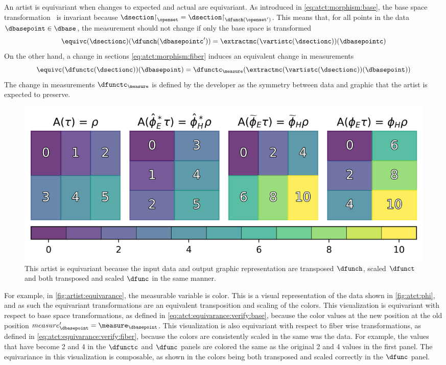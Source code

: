 \documentclass[10pt,journal,compsoc]{IEEEtran}
\renewcommand{\restriction}{\mathord{\upharpoonright}} %
\theoremstyle{definition}
\theoremstyle{remark}
\begin{document}
An artist is equivariant when changes to expected and actual are equivariant. As introduced in \autoref{eq:atct:morphism:base}, the base space transformation \dfunch\ is invariant because $\dsection\restriction_{\openset} = \dsection\restriction_{\dfunch(\openset^{\prime})}$. This means that, for all points in the data $\dbasepoint \in \dbase$, the measurement should not change if only the base space is transformed 
\begin{equation}
  \label{eq:atct:equivarance:verify:base}
  \equivc(\dsectionc)(\dfunch(\dbasepointc^{\prime})) = \extractmc(\vartistc(\dsectionc))(\dbasepointc)
\end{equation}
On the other hand, a change in sections \autoref{eq:atct:morphism:fiber} induces an equivalent change in measurements
\begin{equation}
  \label{eq:atct:equivarance:verify:fiber}
  \equivc(\dfunctc(\dsectionc))(\dbasepoint) = \dfunctc_{\measure}(\extractmc(\vartistc(\dsectionc))(\dbasepoint))
\end{equation}
The change in measurements $\dfunctc_{\measure}$ is defined by the developer as the symmetry between data and graphic that the artist is expected to preserve. 

\begin{figure}[h!]
  \label{fig:artist:equivariance}
  \includegraphics[width=1\columnwidth]{equivariance.png}
  \caption{This artist is equivariant because the input data and output graphic representation are transposed $\dfunch$, scaled $\dfunct$ and both transposed and scaled $\dfunc$ in the same manner.}
\end{figure}
For example, in \autoref{fig:artist:equivarance}, the measurable variable is color. This is a visual representation of the data shown in \autoref{fig:atct:phi}, and as such the equivariant transformations are an equivalent transposition and scaling of the colors. This visualization is equivariant with respect to base space transformations, as defined in \autoref{eq:atct:equivarance:verify:base}, because the color values at the new position at the old position $measure_\dbasepoint^{\prime} = \measure_{\dbasepoint}$. This visualization is also equivariant with respect to fiber wise transformations, as defined in \autoref{eq:atct:equivarance:verify:fiber}, because the colors are consistently scaled in the same was the data. For example, the values that have become 2 and 4 in the $\dfunctc$ and $\dfunc$ panels are colored the same as the original 2 and 4 values in the first panel. The equivariance in this visualization is composable, as shown in the colors being both transposed and scaled correctly in the $\dfunc$ panel.
\end{document}
